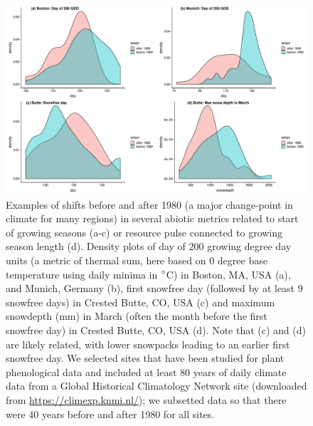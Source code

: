 \documentclass[11pt,letterpaper]{article}
\begin{document}
\begin{figure}[t!]
\centering
\includegraphics[width=1\textwidth]{..//..//R/graphs/otherdat/climdata.pdf}
\caption{Examples of shifts before and after 1980 (a major change-point in climate for many regions) in several abiotic metrics related to start of growing seasons (a-c) or resource pulse connected to growing season length (d). Density plots of day of 200 growing degree day units (a metric of thermal sum, here based on 0 degree base temperature using daily minima in $\degree$C) in Boston, MA, USA (a), and Munich, Germany (b), first snowfree day (followed by at least 9 snowfree days) in Crested Butte, CO, USA (c) and maximum snowdepth (mm) in March (often the month before the first snowfree day) in Crested Butte, CO, USA (d). Note that (c) and (d) are likely related, with lower snowpacks leading to an earlier first snowfree day. We selected sites that have been studied for plant phenological data and included at least 80 years of daily climate data from a Global Historical Climatology Network site (downloaded from \url{https://climexp.knmi.nl/}); we subsetted data so that there were 40 years before and after 1980 for all sites.}
 \label{fig:climdat}
\end{figure}
\end{document}
